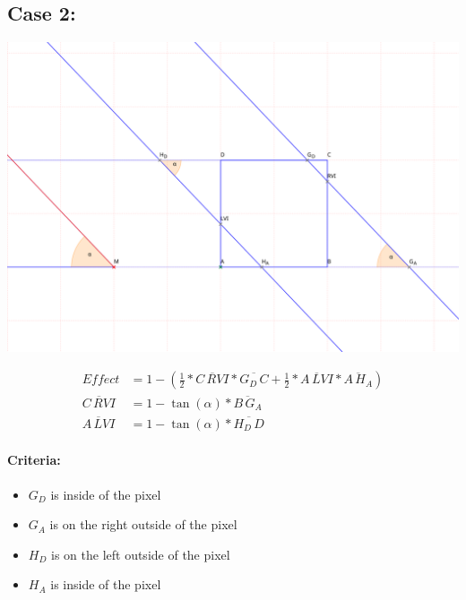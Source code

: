 \documentclass[a4paper,10pt,fleqn]{scrartcl}
\numberwithin{equation}{subsection}
\begin{document}
\subsection{Case 2:}
\begin{minipage}{\textwidth}
\includegraphics[width=\textwidth]{case2}
\end{minipage}
\begin{align}
Effect &= 1 - (\frac{1}{2} * \overline{C\,RVI} * \overline{G_D\,C} + \frac{1}{2} * \overline{A\,LVI} * \overline{A\,H_A})\\
\overline{C\,RVI} &=  1 - \tan(\alpha) * \overline{B\,G_A}\\
\overline{A\,LVI} &=  1 - \tan(\alpha) * \overline{H_D\,D}
\end{align}
\paragraph{Criteria:}
\begin{itemize}
 \item $G_D$ is inside of the pixel
 \item $G_A$ is on the right outside of the pixel
 \item $H_D$ is on the left outside of the pixel
 \item $H_A$ is inside of the pixel
\end{itemize}
\end{document}
